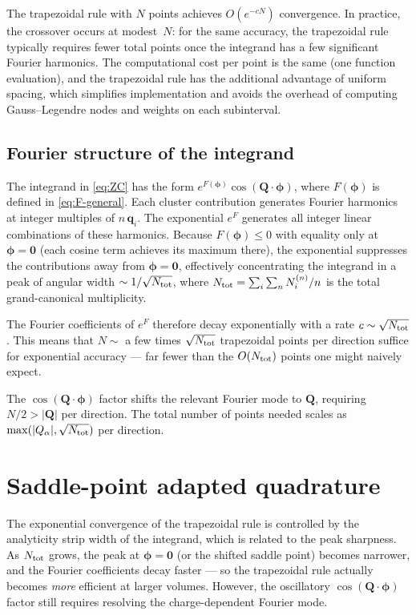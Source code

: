 \documentclass[11pt,a4paper]{article}
\newcommand{\bphi}{\bm{\phi}}
\newcommand{\bq}{\bm{q}}
\newcommand{\bQ}{\bm{Q}}
\begin{document}
The trapezoidal rule with $N$ points achieves $O(e^{-cN})$ convergence.
In practice, the crossover occurs at modest~$N$: for the same accuracy, the trapezoidal rule typically requires fewer total points once the integrand has a few significant Fourier harmonics.
The computational cost per point is the same (one function evaluation), and the trapezoidal rule has the additional advantage of uniform spacing, which simplifies implementation and avoids the overhead of computing Gauss--Legendre nodes and weights on each subinterval.

\subsection{Fourier structure of the integrand}

The integrand in \cref{eq:ZC} has the form $e^{F(\bphi)} \cos(\bQ \cdot \bphi)$, where $F(\bphi)$ is defined in \cref{eq:F-general}.
Each cluster contribution generates Fourier harmonics at integer multiples of $n\,\bq_i$.
The exponential $e^{F}$ generates all integer linear combinations of these harmonics.
Because $F(\bphi) \leq 0$ with equality only at $\bphi = \bm{0}$ (each cosine term achieves its maximum there), the exponential suppresses the contributions away from $\bphi = \bm{0}$, effectively concentrating the integrand in a peak of angular width $\sim 1/\sqrt{N_{\rm tot}}$, where $N_{\rm tot} = \sum_i \sum_n N_i^{(n)}/n$ is the total grand-canonical multiplicity.

The Fourier coefficients of $e^{F}$ therefore decay exponentially with a rate $c \sim \sqrt{N_{\rm tot}}$.
This means that $N \sim$ a few times $\sqrt{N_{\rm tot}}$ trapezoidal points per direction suffice for exponential accuracy --- far fewer than the $O(N_{\rm tot})$ points one might naively expect.

The $\cos(\bQ \cdot \bphi)$ factor shifts the relevant Fourier mode to $\bQ$, requiring $N/2 > |\bQ|$ per direction.
The total number of points needed scales as $\max(|Q_\alpha|, \sqrt{N_{\rm tot}})$ per direction.


\section{Saddle-point adapted quadrature}
\label{sec:saddle}

The exponential convergence of the trapezoidal rule is controlled by the analyticity strip width of the integrand, which is related to the peak sharpness.
As $N_{\rm tot}$ grows, the peak at $\bphi = \bm{0}$ (or the shifted saddle point) becomes narrower, and the Fourier coefficients decay faster --- so the trapezoidal rule actually becomes \emph{more} efficient at larger volumes.
However, the oscillatory $\cos(\bQ \cdot \bphi)$ factor still requires resolving the charge-dependent Fourier mode.
\end{document}
